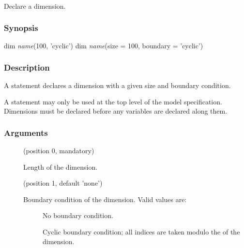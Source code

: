 \subsection{\label{dim}}

Declare a dimension.

\subsubsection*{Synopsis\label{dim_Synopsis}}
\begin{bicode}
dim \textsl{name}(100, 'cyclic')
dim \textsl{name}(size = 100, boundary = 'cyclic')
\end{bicode}


\subsubsection*{Description\label{dim_Description}}

A  statement declares a dimension with a given size and boundary
condition.

A  statement may only be used at the top level of the model
specification. Dimensions must be declared before any variables are declared
along them.

\subsubsection*{Arguments\label{dim_Arguments}}

\begin{description}
\item[] (position 0, mandatory)

Length of the dimension.

\item[] (position 1, default 'none')

Boundary condition of the dimension. Valid values are:

\begin{description}
\item[]

No boundary condition.

\item[]

Cyclic boundary condition; all indices are taken modulo the  of
the dimension.
\end{description}
\end{description}


